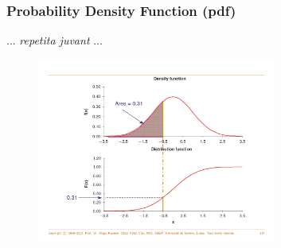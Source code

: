 \documentclass[notes=show,smaller,handout]{beamer}
\begin{document}
\begin{frame}%

\frametitle{Probability Density Function (pdf)}
 
 ... \textit{repetita juvant} ...
 
\begin{figure}[ptb]\centering
\includegraphics[width=0.7\textwidth,height=0.65\textheight]{Diego_F.pdf}%
\end{figure}%

\end{frame}

%
% 
% 
%
\end{document}
